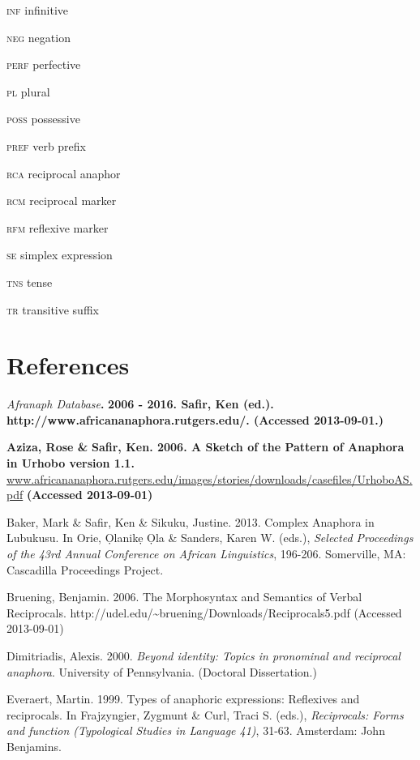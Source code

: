 \documentclass[output=paper]{langsci/langscibook}
\begin{document}
\textsc{inf}    infinitive

\textsc{neg}    negation

\textsc{perf}    perfective

\textsc{pl}    plural

\textsc{poss}    possessive

\textsc{pref}    verb prefix

\textsc{rca}    reciprocal anaphor

\textsc{rcm}    reciprocal marker

\textsc{rfm}    reflexive marker

\textsc{se}    simplex expression  

\textsc{tns}    tense

\textsc{tr}    transitive suffix

\section{References}

\emph{\textup{Afranaph Database}}\textbf{\textmd{.}} \textbf{2006 - 2016. Safir, Ken (ed.). http://www.africananaphora.rutgers.edu/. (Accessed 2013-09-01.)}

\textbf{\textmd{Aziza, Rose \&}} \textbf{ Safir, Ken. 2006. A Sketch of the Pattern of Anaphora in Urhobo version 1.1.} \href{http://www.africananaphora.rutgers.edu/images/stories/downloads/casefiles/UrhoboAS.pdf}{{www.africananaphora.rutgers.edu/images/stories/downloads/casefiles/UrhoboAS.pdf}}\textbf{ (Accessed 2013-09-01)}

Baker, Mark \& Safir, Ken \& Sikuku, Justine. 2013. Complex Anaphora in Lubukusu. In Orie, Ọlanikẹ Ọla \& Sanders, Karen W. (eds.), \textit{Selected Proceedings of the 43rd Annual Conference on African Linguistics}, 196-206. Somerville, MA: Cascadilla Proceedings Project.

Bruening, Benjamin. 2006. The Morphosyntax and Semantics of Verbal Reciprocals. http://udel.edu/{\textasciitilde}bruening/Downloads/Reciprocals5.pdf (Accessed 2013-09-01)

\begin{styleWWDefault}
Dimitriadis, Alexis. 2000. \textit{Beyond identity: Topics in pronominal and reciprocal anaphora}. University of Pennsylvania. (Doctoral Dissertation.)
\end{styleWWDefault}

Everaert, Martin. 1999. Types of anaphoric expressions: Reflexives and reciprocals. In Frajzyngier, Zygmunt \& Curl, Traci S. (eds.), \textit{Reciprocals: Forms and function (Typological Studies in Language 41)}, 31-63. Amsterdam: John Benjamins.
\end{document}
